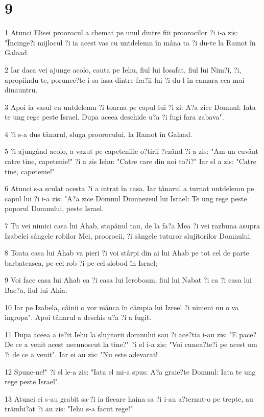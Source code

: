 \chapter{9}

\par 1 Atunci Elisei proorocul a chemat pe unul dintre fiii proorocilor ?i i-a zis: "Încinge?i mijlocul ?i ia acest vas cu untdelemn în mâna ta ?i du-te la Ramot în Galaad.
\par 2 Iar daca vei ajunge acolo, cauta pe Iehu, fiul lui Iosafat, fiul lui Nim?i, ?i, apropiindu-te, porunce?te-i sa iasa dintre fra?ii lui ?i du-l în camara cea mai dinauntru.
\par 3 Apoi ia vasul cu untdelemn ?i toarna pe capul lui ?i zi: A?a zice Domnul: Iata te ung rege peste Israel. Dupa aceea deschide u?a ?i fugi fara zabava".
\par 4 ?i s-a dus tânarul, sluga proorocului, la Ramot în Galaad.
\par 5 ?i ajungând acolo, a vazut pe capeteniile o?tirii ?ezând ?i a zis: "Am un cuvânt catre tine, capetenie!" ?i a zis Iehu: "Catre care din noi to?i?" Iar el a zis: "Catre tine, capetenie!"
\par 6 Atunci s-a sculat acesta ?i a intrat în casa. Iar tânarul a turnat untdelemn pe capul lui ?i i-a zis: "A?a zice Domnul Dumnezeul lui Israel: Te ung rege peste poporul Domnului, peste Israel.
\par 7 Tu vei nimici casa lui Ahab, stapânul tau, de la fa?a Mea ?i vei razbuna asupra Izabelei sângele robilor Mei, proorocii, ?i sângele tuturor slujitorilor Domnului.
\par 8 Toata casa lui Ahab va pieri ?i voi stârpi din ai lui Ahab pe tot cel de parte barbateasca, pe cel rob ?i pe cel slobod în Israel;
\par 9 Voi face casa lui Ahab ca ?i casa lui Ieroboam, fiul lui Nabat ?i ca ?i casa lui Bae?a, fiul lui Ahia.
\par 10 Iar pe Izabela, câinii o vor mânca în câmpia lui Izreel ?i nimeni nu o va îngropa". Apoi tânarul a deschis u?a ?i a fugit.
\par 11 Dupa aceea a ie?it Iehu la slujitorii domnului sau ?i ace?tia i-au zis: "E pace? De ce a venit acest necunoscut la tine?" ?i el i-a zis: "Voi cunoa?te?i pe acest om ?i de ce a venit". Iar ei au zis: "Nu este adevarat!
\par 12 Spune-ne!" ?i el le-a zis: "Iata el mi-a spus: A?a graie?te Domnul: Iata te ung rege peste Israel".
\par 13 Atunci ei s-au grabit sa-?i ia fiecare haina sa ?i i-au a?ternut-o pe trepte, au trâmbi?at ?i au zis: "Iehu s-a facut rege!"
